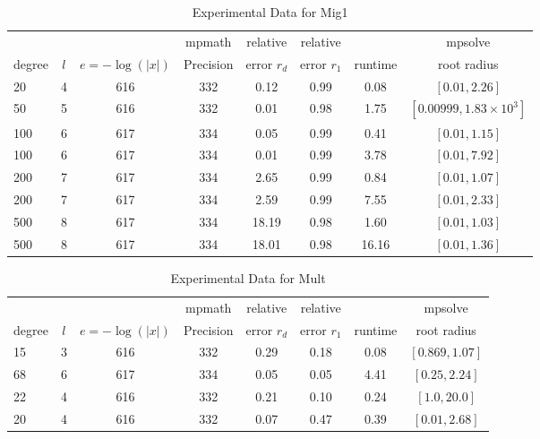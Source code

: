 \documentclass[sigconf]{acmart}
\begin{document}
\begin{table}[t]
\caption{Experimental Data for Mig1}
\label{tab:mig1}
\vskip -0.15in
\begin{center}
\begin{small}
\begin{sc}
\begin{tabular}{lccccccc}
\toprule
&  &  & mpmath & relative  & relative &  & mpsolve \\
degree  & $l$& $e=-\log(|x|)$& Precision &error $r_d$       & error $r_1$ &runtime& root radius\\
\midrule
   20 & 4 & 616 & 332 & 0.12 & 0.99 & 0.08 & $[0.01, 2.26]$ \\
   50 & 5 & 616 & 332 & 0.01 & 0.98 & 1.75 & $[0.00999,1.83 \times 10^{3}]$\\
 100 & 6 & 617 & 334 & 0.05 & 0.99 & 0.41 & $[0.01,1.15]$\\ %
 100 & 6 & 617 & 334 & 0.01 & 0.99 & 3.78 & $[0.01,7.92]$\\ %
 200 & 7 & 617 & 334 & 2.65 & 0.99 & 0.84 & $[0.01,1.07]$\\%
 200 & 7 & 617 & 334 & 2.59 & 0.99 & 7.55 & $[0.01, 2.33]$\\%
 500 & 8 & 617 & 334 & 18.19 & 0.98 & 1.60 & $[0.01, 1.03]$\\ 
 500 & 8 & 617 & 334 & 18.01 & 0.98 & 16.16 & $[0.01,1.36]$\\ %
\bottomrule
\end{tabular}
\end{sc}
\end{small}
\end{center}
\vskip 0.05in
\end{table}


\begin{table}[t]
\caption{Experimental Data for Mult}
\label{tab:mult}
\vskip -0.15in
\begin{center}
\begin{small}
\begin{sc}
\begin{tabular}{lccccccc}
\toprule
&  &  & mpmath & relative  & relative &  & mpsolve \\
degree  & $l$& $e=-\log(|x|)$& Precision &error $r_d$       & error $r_1$ &runtime& root radius\\
\midrule
   15 & 3 & 616 & 332 & 0.29 & 0.18 & 0.08 & $[0.869,1.07]$ \\ %
   68 & 6 & 617 & 334 & 0.05 & 0.05 & 4.41 & $[0.25,2.24]$\\ %
   22 & 4 & 616 & 332 & 0.21 & 0.10 & 0.24 & $[1.0, 20.0]$\\ %
   20 & 4 & 616 & 332 & 0.07 & 0.47 & 0.39 & $[0.01, 2.68]$\\ %
\bottomrule
\end{tabular}
\end{sc}
\end{small}
\end{center}
\vskip 0.05in
\end{table}
\end{document}
